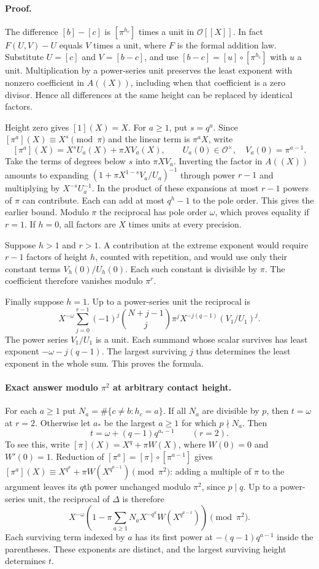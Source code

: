 \paragraph{Proof.}
The difference $[b]-[c]$ is $[\pi^{h_c}]$ times a unit in $\mathcal O[[X]]$.
In fact $F(U,V)-U$ equals $V$ times a unit, where $F$ is the formal
addition law. Substitute $U=[c]$ and $V=[b-c]$, and use
$[b-c]=[u]\circ[\pi^{h_c}]$ with $u$ a unit.
Multiplication by a power-series unit preserves the least exponent with
nonzero coefficient in $A((X))$, including when that coefficient is a
zero divisor. Hence all differences at the same height can be replaced
by identical factors.

Height zero gives $[1](X)=X$. For $a\ge1$, put $s=q^a$.
Since $[\pi^a](X)\equiv X^s\pmod\pi$ and the linear term is
$\pi^aX$, write
\[
            [\pi^a](X)=X^s U_a(X)+\pi X V_a(X),\qquad
            U_a(0)\in\mathcal O^\times,\quad V_a(0)=\pi^{a-1}.
\]
Take the terms of degrees below $s$ into $\pi XV_a$.
Inverting the factor in $A((X))$ amounts to expanding
$(1+\pi X^{1-s} V_a/U_a)^{-1}$ through power $r-1$ and multiplying
by $X^{-s}U_a^{-1}$. In the product of these expansions at most
$r-1$ powers of $\pi$ can contribute. Each can add at most $q^h-1$
to the pole order. This gives the earlier bound. Modulo $\pi$ the
reciprocal has pole order $\omega$, which proves equality if $r=1$.
If $h=0$, all factors are $X$ times units at every precision.

Suppose $h>1$ and $r>1$. A contribution at the extreme exponent would
require $r-1$ factors of height $h$, counted with repetition, and would
use only their constant terms $V_h(0)/U_h(0)$. Each such constant is
divisible by $\pi$. The coefficient therefore vanishes modulo $\pi^r$.

Finally suppose $h=1$. Up to a power-series unit the reciprocal is
\[
 X^{-\omega}
 \sum_{j=0}^{r-1}(-1)^j\binom{N+j-1}{j}
       \pi^j X^{-j(q-1)}(V_1/U_1)^j .
\]
The power series $V_1/U_1$ is a unit. Each summand whose scalar survives has
least exponent $-\omega-j(q-1)$. The largest surviving $j$ thus
determines the least exponent in the whole sum. This proves the formula.

\paragraph{Exact answer modulo $\pi^2$ at arbitrary contact height.}
For each $a\ge1$ put $N_a=\#\{c\ne b:h_c=a\}$.
If all $N_a$ are divisible by $p$, then $t=\omega$ at $r=2$.
Otherwise let $a_*$ be the largest $a\ge1$ for which $p\nmid N_a$. Then
\[
                  t=\omega+(q-1)q^{a_*-1}\qquad(r=2).
\]
To see this, write $[\pi](X)=X^q+\pi W(X)$, where $W(0)=0$ and
$W'(0)=1$. Reduction of $[\pi^a]=[\pi]\circ[\pi^{a-1}]$ gives
$[\pi^a](X)\equiv X^{q^a}+\pi W(X^{q^{a-1}})\pmod{\pi^2}$:
adding a multiple of $\pi$ to the argument leaves its $q$th power
unchanged modulo $\pi^2$, since $p\mid q$. Up to a power-series unit,
the reciprocal of $\Delta$ is therefore
\[
 X^{-\omega}\left(1-
 \pi\sum_{a\ge1}N_a X^{-q^a}W(X^{q^{a-1}})\right)\pmod{\pi^2}.
\]
Each surviving term indexed by $a$ has its first power at
$-(q-1)q^{a-1}$ inside the parentheses. These exponents are distinct,
and the largest surviving height determines $t$.


